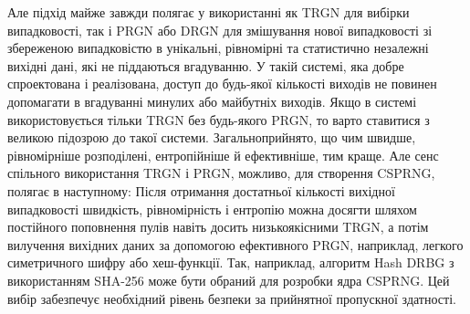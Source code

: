Але підхід майже завжди полягає у використанні як TRGN для вибірки випадковості, так і PRGN або DRGN для змішування нової випадковості зі збереженою випадковістю в унікальні, рівномірні та статистично незалежні вихідні дані, які не піддаються вгадуванню. У такій системі, яка добре спроектована і реалізована, доступ до будь-якої кількості виходів не повинен допомагати в вгадуванні минулих або майбутніх виходів. Якщо в системі використовується тільки TRGN без будь-якого PRGN, то варто ставитися з великою підозрою до такої системи. Загальноприйнято, що чим швидше, рівномірніше розподілені, ентропійніше й ефективніше, тим краще. Але сенс спільного використання TRGN і PRGN, можливо, для створення CSPRNG, полягає в наступному: Після отримання достатньої кількості вихідної випадковості швидкість, рівномірність і ентропію можна досягти шляхом постійного поповнення пулів навіть досить низькоякісними TRGN, а потім вилучення вихідних даних за допомогою ефективного PRGN, наприклад, легкого симетричного шифру або хеш-функції. Так, наприклад, алгоритм Hash DRBG з використанням SHA-256 може бути обраний для розробки ядра CSPRNG. Цей вибір забезпечує необхідний рівень безпеки за прийнятної пропускної здатності.
